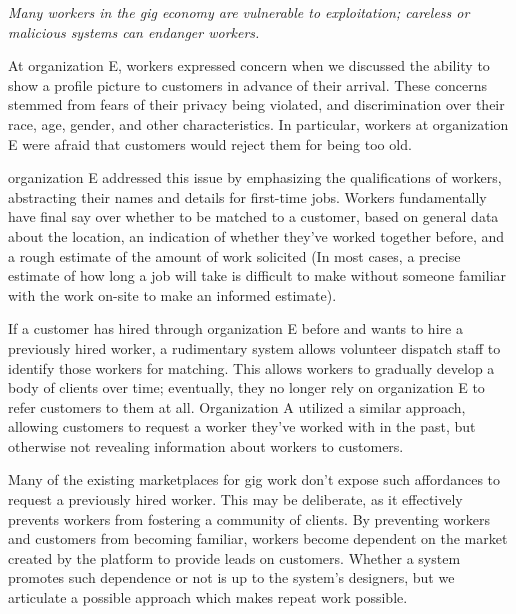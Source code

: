 \textit{Many workers in the gig economy are vulnerable to exploitation;
careless or malicious systems can endanger workers.}

At organization E, workers expressed concern when we discussed the ability to show a profile picture to customers in advance of their arrival.
These concerns stemmed from fears of their privacy being violated,
and discrimination over their race, age, gender, and other characteristics.
In particular, workers at organization E were afraid that customers would reject them for being too old.

organization E addressed this issue by emphasizing the qualifications of workers,
abstracting their names and details for first-time jobs.
Workers fundamentally have final say over whether to be matched to a customer,
based on general data about the location,
an indication of whether they've worked together before, and a rough estimate of the amount of work solicited
(In most cases, a precise estimate of how long a job will take is difficult to make without someone familiar with the work on-site to make an informed estimate).

If a customer has hired through organization E before and wants to hire a previously hired worker,
a rudimentary system allows volunteer dispatch staff to identify those workers for matching.
This allows workers to gradually develop a body of clients over time;
eventually, they no longer rely on organization E to refer customers to them at all.
Organization A utilized a similar approach, allowing customers to request a worker they've worked with in the past,
but otherwise not revealing information about workers to customers.

Many of the existing marketplaces for gig work don't expose such affordances to request a previously hired worker.
This may be deliberate, as it effectively prevents workers from fostering a community of clients.
By preventing workers and customers from becoming familiar,
workers become dependent on the market created by the platform to provide leads on customers.
Whether a system promotes such dependence or not is up to the system's designers,
but we articulate a possible approach which makes repeat work possible.

